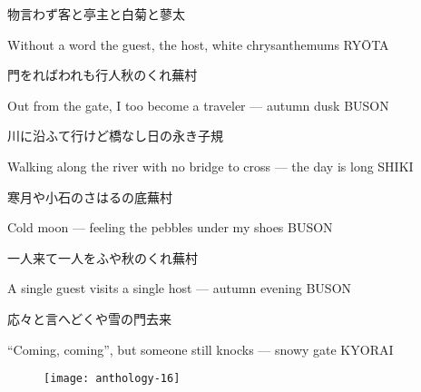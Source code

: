 \begin{haiku}
    {\FH 物言わず客と亭主と白菊と}\hfill{\FH 蓼太}

    \vin{} Without a word
    \vin{} \vin{} the guest, the host,
    \vin{} \vin{} \vin{} white chrysanthemums \hspace{\fill} RY\={O}TA
\end{haiku}

\begin{haiku}
    {\FH 門をればわれも行人秋のくれ}\hfill{\FH 蕪村}

    \vin{} Out from the gate,
    \vin{} \vin{} I too become a traveler ---
    \vin{} \vin{} \vin{} autumn dusk \hspace{\fill} BUSON
\end{haiku}

\begin{haiku}
    {\FH 川に沿ふて行けど橋なし日の永き}\hfill{\FH 子規}

    \vin{} Walking along the river
    \vin{} \vin{} with no bridge to cross ---
    \vin{} \vin{} \vin{} the day is long \hspace{\fill} SHIKI
\end{haiku}

\begin{haiku}
    {\FH 寒月や小石のさはるの底}\hfill{\FH 蕪村}

    \vin{} Cold moon ---
    \vin{} \vin{} feeling the pebbles
    \vin{} \vin{} \vin{} under my shoes \hspace{\fill} BUSON
\end{haiku}

\begin{haiku}
    {\FH 一人来て一人をふや秋のくれ}\hfill{\FH 蕪村}

    \vin{} A single guest
    \vin{} \vin{} visits a single host ---
    \vin{} \vin{} \vin{} autumn evening \hspace{\fill} BUSON
\end{haiku}

\begin{haiku}
    {\FH 応々と言へどくや雪の門}\hfill{\FH 去来}

    \vin{} ``Coming, coming'',
    \vin{} \vin{} but someone still knocks ---
    \vin{} \vin{} \vin{} snowy gate \hspace{\fill} KYORAI
\end{haiku}

\begin{figure}
    \texttt{[image: anthology-16]}
\end{figure}


